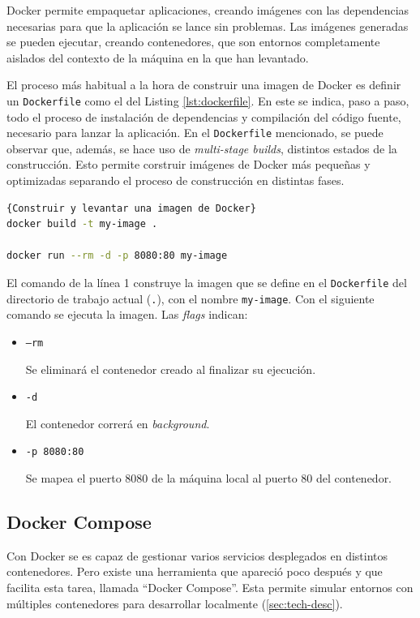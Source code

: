 Docker permite empaquetar aplicaciones, creando imágenes con las dependencias necesarias para que la aplicación se lance sin problemas. Las imágenes generadas se pueden ejecutar, creando contenedores, que son entornos completamente aislados del contexto de la máquina en la que han levantado.

El proceso más habitual a la hora de construir una imagen de Docker es definir un \texttt{Dockerfile} como el del Listing \ref{lst:dockerfile}. En este se indica, paso a paso, todo el proceso de instalación de dependencias y compilación del código fuente, necesario para lanzar la aplicación. En el \texttt{Dockerfile} mencionado, se puede observar que, además, se hace uso de \textit{multi-stage builds}, distintos estados de la construcción. Esto permite corstruir imágenes de Docker más pequeñas y optimizadas separando el proceso de construcción en distintas fases.

\begin{lstlisting}[language=bash,label=lst:dockerbuildrun]{Construir y levantar una imagen de Docker}
docker build -t my-image .

docker run --rm -d -p 8080:80 my-image
\end{lstlisting}

El comando de la línea 1 construye la imagen que se define en el \texttt{Dockerfile} del directorio de trabajo actual (\texttt{.}), con el nombre \texttt{my-image}. Con el siguiente comando se ejecuta la imagen. Las \textit{flags} indican:

\begin{itemize}
  \item \texttt{--rm}

    Se eliminará el contenedor creado al finalizar su ejecución.

  \item \texttt{-d}

    El contenedor correrá en \textit{background}.

  \item \texttt{-p 8080:80}

    Se mapea el puerto 8080 de la máquina local al puerto 80 del contenedor.
\end{itemize}

\subsection*{Docker Compose}
\label{tech:docker-compose}

Con Docker se es capaz de gestionar varios servicios desplegados en distintos contenedores. Pero existe una herramienta que apareció poco después y que facilita esta tarea, llamada ``Docker Compose''\cite{docker-compose}. Esta permite simular entornos con múltiples contenedores para desarrollar localmente (\ref{sec:tech-desc}).

